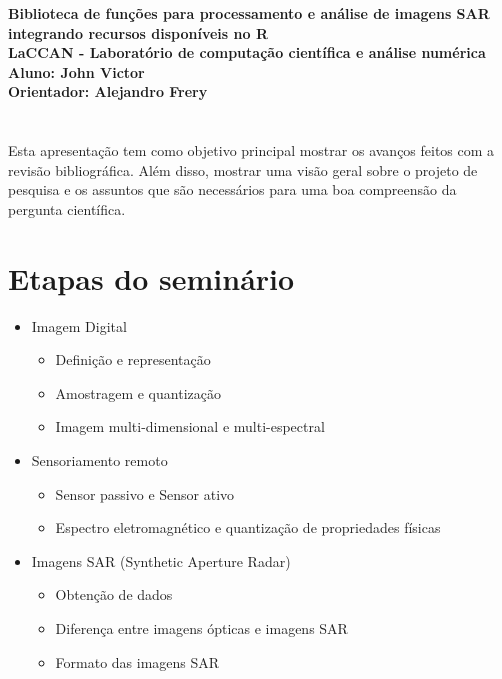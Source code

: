 \documentclass[12pt, a4paper]{article}
\begin{document}
	\begin{center}
	\textbf{\LARGE{Biblioteca de funções para processamento e análise de imagens SAR integrando recursos disponíveis no R}}\\
	\vspace{7mm}
	\textbf{\large{LaCCAN - Laboratório de computação científica e análise numérica}}\\ 
	\vspace{4mm}
	\textbf{\large{Aluno: John Victor}}\\
	\vspace{4mm}
	\textbf{\large{Orientador: Alejandro Frery}}\\
	\end{center}	
        
    \vspace{4mm}
    \section*{}
    \vspace{4mm}
    
Esta apresentação tem como objetivo principal mostrar os avanços feitos com a revisão bibliográfica. Além disso, mostrar uma visão geral sobre o projeto de pesquisa e os assuntos que são necessários para uma boa compreensão da pergunta científica.

	\section{Etapas do seminário}
    
    \begin{itemize}
		\item Imagem Digital
		\begin{itemize}
			\item Definição e representação
            \item Amostragem e quantização
    		\item Imagem multi-dimensional e multi-espectral 
		\end{itemize}
		\item Sensoriamento remoto
			\begin{itemize}
				\item Sensor passivo e Sensor ativo
				\item Espectro eletromagnético e quantização de propriedades físicas
            \end{itemize}
        \item Imagens SAR (Synthetic Aperture Radar)    
            \begin{itemize}
				\item Obtenção de dados
                \item Diferença entre imagens ópticas e imagens SAR
                \item Formato das imagens SAR
			\end{itemize}
		

	\end{itemize}
	
\end{document}
